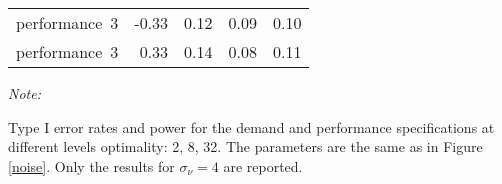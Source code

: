 \begin{table}
\begin{threeparttable}
\begin{tabular}[t]{lrrrr}
\hspace{1em}performance~3 & -0.33 & 0.12 & 0.09 & 0.10\\
\hspace{1em}performance~3 & 0.33 & 0.14 & 0.08 & 0.11\\
\bottomrule
\end{tabular}
\begin{tablenotes}
\item \textit{Note: } 
\item Type I error rates and power for the demand 
            and performance specifications at different
            levels optimality: 2, 8, 32. The
            parameters are the same as in Figure
            \ref{noise}. Only the results for 
            $\sigma_{\nu} = 4$ are reported.
\end{tablenotes}
\end{threeparttable}
\end{table}
